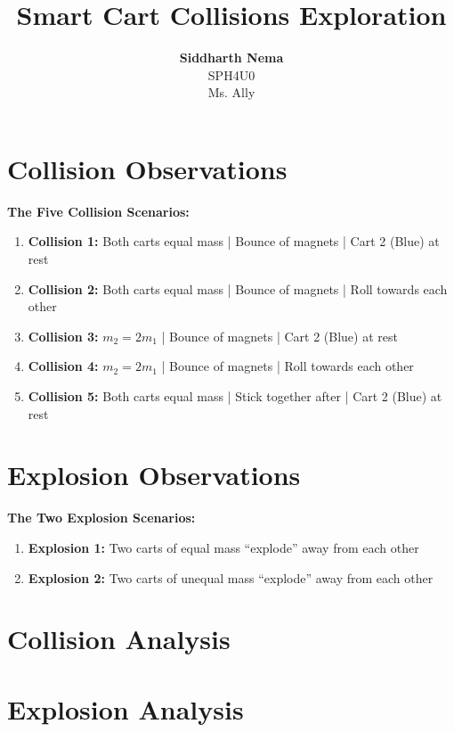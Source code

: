\documentclass[12pt,letterpaper]{article}
\title{\textbf{Smart Cart Collisions Exploration}}
\author{\textbf{Siddharth Nema}\\SPH4U0 \\Ms.\hspace{-1mm} Ally}
\begin{document}
\maketitle
\newpage

\section{Collision Observations}
\textbf{The Five Collision Scenarios:}
\vspace{-4mm}
\begin{enumerate}
	\itemsep-0.75em
	\item \textbf{Collision 1:} Both carts equal mass | Bounce of magnets | Cart 2 (Blue) at rest
	\item \textbf{Collision 2:} Both carts equal mass | Bounce of magnets | Roll towards each other
	\item \textbf{Collision 3:} $m_{2} = 2m_{1}$ | Bounce of magnets | Cart 2 (Blue) at rest
	\item \textbf{Collision 4:} $m_{2} = 2m_{1}$ | Bounce of magnets | Roll towards each other
	\item \textbf{Collision 5:} Both carts equal mass | Stick together after | Cart 2 (Blue) at rest
\end{enumerate}



\newpage
\section{Explosion Observations}
\textbf{The Two Explosion Scenarios:}
\vspace{-4mm}
\begin{enumerate}
	\itemsep-0.75em
	\item \textbf{Explosion 1:} Two carts of equal mass “explode” away from each other
	\item \textbf{Explosion 2:} Two carts of unequal mass “explode” away from each other
\end{enumerate}



\section{Collision Analysis}

\section{Explosion Analysis}
\end{document}
